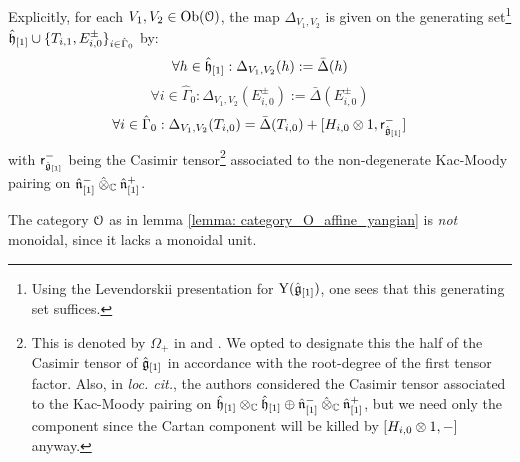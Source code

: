 \begin{lemma}
            Explicitly, for each $V_1, V_2 \in \mathrm{Ob}(\mathcal{O})$, the map $\Delta_{V_1, V_2}$ is given on the generating set\footnote{Using the Levendorskii presentation for $\mathrm{Y}(\hat{\mathfrak{g}}_{[1]})$, one sees that this generating set suffices.} $\hat{\mathfrak{h}}_{[1]} \cup \{T_{i, 1}, E_{i, 0}^{\pm}\}_{i \in \hat{\Gamma}_0}$ by:
                $$\forall h \in \hat{\mathfrak{h}}_{[1]}: \Delta_{V_1, V_2}(h) := \bar{\Delta}(h)$$
                $$\forall i \in \hat{\Gamma}_0: \Delta_{V_1, V_2}(E_{i, 0}^{\pm}) := \bar{\Delta}(E_{i, 0}^{\pm})$$
                $$\forall i \in \hat{\Gamma}_0: \Delta_{V_1, V_2}(T_{i, 0}) = \bar{\Delta}(T_{i, 0}) + [H_{i, 0} \tensor 1, \sfr_{ \hat{\g}_{[1]} }^-]$$
            with $\mathsf{r}_{ \hat{\mathfrak{g}}_{[1]} }^-$ being the Casimir tensor\footnote{This is denoted by $\Omega_+$ in \cite{guay_nakajima_wendlandt_affine_yangian_coproduct} and \cite{guay_nakajima_wendlandt_affine_yangian_vertex_representations_and_PBW}. We opted to designate this the  half of the Casimir tensor of $\hat{\mathfrak{g}}_{[1]}$ in accordance with the root-degree of the first tensor factor. Also, in \textit{loc. cit.}, the authors considered the Casimir tensor associated to the Kac-Moody pairing on $\hat{\h}_{[1]} \tensor_{\bbC} \hat{\h}_{[1]} \oplus \hat{\n}_{[1]}^- \hattensor_{\bbC} \hat{\n}_{[1]}^+$, but we need only the  component since the Cartan component will be killed by $[H_{i, 0} \tensor 1, -]$ anyway.} associated to the non-degenerate Kac-Moody pairing on $\hat{\n}_{[1]}^- \hattensor_{\bbC} \hat{\n}_{[1]}^+$.
        \end{lemma}
        \begin{remark}
            The category $\mathcal{O}$ as in lemma \ref{lemma: category_O_affine_yangian} is \textit{not} monoidal, since it lacks a monoidal unit. 
        \end{remark}
